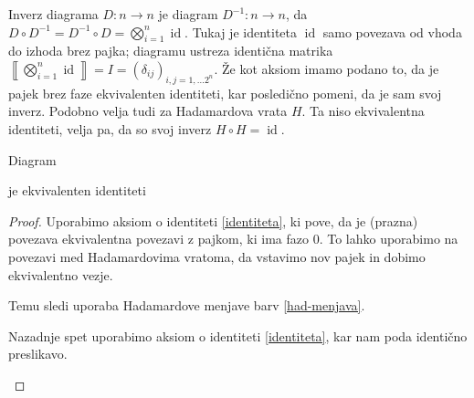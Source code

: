 \documentclass[mat1]{fmfdelo}
\newcommand{\interpret}[1]{\left\llbracket #1 \right\rrbracket}
\DeclareMathOperator*{\id}{id}
\begin{document}
Inverz diagrama \(D:n\to n\) je diagram \(D^{-1}:n\to n\), da \(D\circ D^{-1} = D^{-1}\circ D = \bigotimes_{i=1}^n\id\). Tukaj je identiteta \(\id\) samo povezava od vhoda do izhoda brez pajka; diagramu ustreza identična matrika \(\interpret{\bigotimes_{i=1}^n\id} = I = (\delta_{ij})_{i,j=1,\ldots 2^n}\). Že kot aksiom imamo podano to, da je pajek brez faze ekvivalenten identiteti, kar posledično pomeni, da je sam svoj inverz. Podobno velja tudi za Hadamardova vrata \(H\). Ta niso ekvivalentna identiteti, velja pa, da so svoj inverz \(H\circ H = \id\).
\begin{izrek}\label{had-inverz}
    Diagram
\begin{center}
\end{center}
je ekvivalenten identiteti
\end{izrek}
\begin{proof}

Uporabimo aksiom o identiteti \ref{identiteta}, ki pove, da je (prazna) povezava ekvivalentna povezavi z pajkom, ki ima fazo 0. To lahko uporabimo na povezavi med Hadamardovima vratoma, da vstavimo nov pajek in dobimo ekvivalentno vezje.
\begin{center}
\end{center}
Temu sledi uporaba Hadamardove menjave barv \ref{had-menjava}.
\begin{center}
\end{center}
Nazadnje spet uporabimo aksiom o identiteti \ref{identiteta}, kar nam poda identično preslikavo.
\begin{center}
\end{center}
\end{proof}
\end{document}
